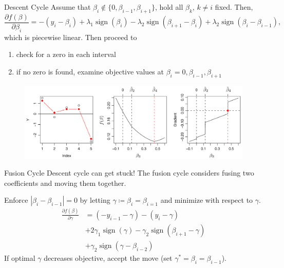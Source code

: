 \documentclass[10pt,ignorenonframetext]{beamer}
\DeclareMathOperator{\sign}{sign}
\begin{document}
\begin{frame}{Descent Cycle}
Assume that \(\beta_i \notin \{0, \beta_{i-1}, \beta_{i+1}\}\), hold all \(\beta_k\), \(k \neq i\) fixed. Then,
\[
\frac{\partial f(\beta)}{\partial \beta_i} = -(y_i - \beta_i) + \lambda_1 \sign(\beta_i) - \lambda_2 \sign(\beta_{i+1} - \beta_i) + \lambda_2 \sign(\beta_i - \beta_{i-1}),
\]
which is \alert{piecewise linear}. \pause Then proceed to

\begin{enumerate}
    \item check for a zero in each interval
    \item if no zero is found, examine objective values at \(\beta_i = 0, \beta_{i-1}, \beta_{i+1}\)
\end{enumerate}

\begin{figure}
    \centering
    \includegraphics[width=\linewidth]{figures/fused-cd-cycles.png}
\end{figure}
\end{frame}

\begin{frame}{Fusion Cycle}
Descent cycle can get stuck! The fusion cycle considers fusing \alert{two} coefficients and moving them together.\medskip

Enforce \(|\beta_i - \beta_{i-1}| = 0\) by letting \(\gamma \coloneqq \beta_i = \beta_{i=1}\) and minimize with respect to \(\gamma\).
\[
\begin{aligned}
\frac{\partial f(\beta)}{\partial \gamma} &= (-y_{i-1} - \gamma) - (y_i - \gamma) \\
&+ 2\gamma_1 \sign(\gamma) - \gamma_2 \sign(\beta_{i+1} - \gamma) \\ 
&+ \gamma_2\sign(\gamma - \beta_{i-2})
\end{aligned}
\]
If optimal \(\gamma\) decreases objective, accept the move (set \(\gamma^* = \beta_i = \beta_{i-1}\)).

\end{frame}
\end{document}
